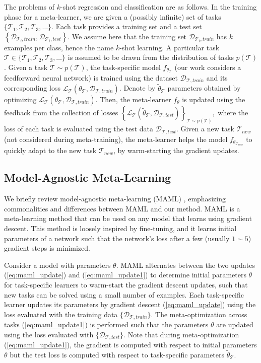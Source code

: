 \documentclass{article}
\newcommand{\calD}{{\mathcal{D}}}
\newcommand{\calT}{{\mathcal{T}}}
\newcommand{\0}{{\bf 0}}
\newcommand{\loss}{\mathcal{L}_{\calT}}
\begin{document}
The problems of $k$-shot regression and classification are as follows.
In the training phase for a meta-learner, we are given a (possibly infinite) set of tasks $\{\calT_1,\calT_2, \calT_3, \ldots\}$.
Each task provides a training set and a test set $\left\{\calD_{\calT_i,train},\calD_{\calT_i,test}\right\}$.
We assume here that the training set $\calD_{\calT_i,train}$ has $k$ examples per class, hence the name $k$-shot learning.
A particular task $\calT \in \{\calT_1,\calT_2, \calT_3, \ldots\}$ is assumed to be drawn from the distribution of tasks $p(\calT)$.
Given a task $\calT \sim p(\calT)$, the task-specific model $f_{\theta_\calT}$ (our work considers a feedforward neural network)
is trained using the dataset $\calD_{\calT,train}$ and 
its corresponding loss $\loss (\theta_\calT,\calD_{\calT,train})$. 
Denote by $\widetilde{\theta}_\calT$ parameters obtained by optimizing $\loss (\theta_\calT,\calD_{\calT,train})$.
Then, the meta-learner $f_{\theta}$ is updated using the feedback from the collection of losses
$\left\{\loss (\widetilde{\theta}_\calT,\calD_{\calT,test}) \right\}_{\calT \sim p(\calT)},$
where the loss of each task is evaluated using the test data $\calD_{\calT,test}$.
Given a new task $\calT_{new}$ (not considered during meta-training),
the meta-learner helps the model $f_{\theta_{\calT_{new}}}$ to quickly adapt to the new task $\calT_{new}$,
by warm-starting the gradient updates.

\subsection{Model-Agnostic Meta-Learning}
We briefly review model-agnostic meta-learning (MAML) \cite{FinnC2017icml}, emphasizing commonalities and differences between MAML and our method.
MAML is a meta-learning method that can be used on any model that learns using gradient descent. 
This method is loosely inspired by fine-tuning, and it learns initial parameters of a network such that the network's loss after a few (usually $1 \sim 5$) gradient steps is minimized.

Consider a model with parameters $\theta$.
MAML alternates between the two updates (\ref{eq:maml_update}) and (\ref{eq:maml_update1})
to determine initial parameters $\theta$ 
for task-specific learners to warm-start the gradient descent updates,
such that new tasks can be solved using a small number of examples.
Each task-specific learner updates its parameters by gradient descent (\ref{eq:maml_update}) 
using the loss evaluated with the training data $\{\calD_{\calT,train}\}$. 
The meta-optimization across tasks (\ref{eq:maml_update1}) is performed such that the parameters $\theta$ are updated
using the loss evaluated with $\{\calD_{\calT,test}\}$.
Note that during meta-optimization (\ref{eq:maml_update1}), the gradient is computed with respect to initial parameters $ \theta $ but the test loss is computed with respect to task-specific parameters $ \widetilde{\theta}_{\calT} $.
\end{document}
